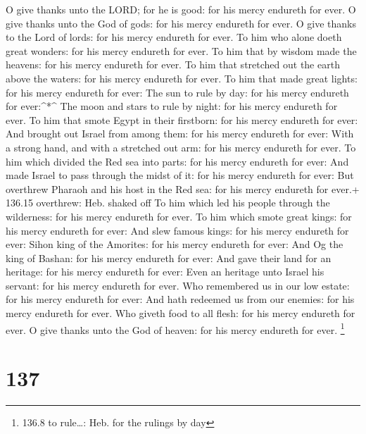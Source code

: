  O give thanks unto the LORD; for he is good: for his mercy
endureth for ever.  O give thanks unto the God of gods: for
his mercy endureth for ever.  O give thanks to the Lord of
lords: for his mercy endureth for ever.  To him who alone
doeth great wonders: for his mercy endureth for ever.  To
him that by wisdom made the heavens: for his mercy endureth for ever.
 To him that stretched out the earth above the waters: for
his mercy endureth for ever.  To him that made great lights:
for his mercy endureth for ever:  The sun to rule by day:
for his mercy endureth for ever:\^{}*\^{}  The moon and
stars to rule by night: for his mercy endureth for ever. 
To him that smote Egypt in their firstborn: for his mercy endureth for
ever:  And brought out Israel from among them: for his
mercy endureth for ever:  With a strong hand, and with a
stretched out arm: for his mercy endureth for ever.  To him
which divided the Red sea into parts: for his mercy endureth for ever:
 And made Israel to pass through the midst of it: for his
mercy endureth for ever:  But overthrew Pharaoh and his
host in the Red sea: for his mercy endureth for ever.+ 136.15 overthrew:
Heb. shaked off  To him which led his people through the
wilderness: for his mercy endureth for ever.  To him which
smote great kings: for his mercy endureth for ever:  And
slew famous kings: for his mercy endureth for ever:  Sihon
king of the Amorites: for his mercy endureth for ever:  And
Og the king of Bashan: for his mercy endureth for ever: 
And gave their land for an heritage: for his mercy endureth for ever:
 Even an heritage unto Israel his servant: for his mercy
endureth for ever.  Who remembered us in our low estate:
for his mercy endureth for ever:  And hath redeemed us from
our enemies: for his mercy endureth for ever.  Who giveth
food to all flesh: for his mercy endureth for ever.  O give
thanks unto the God of heaven: for his mercy endureth for ever.
\footnote{136.8 to rule\ldots: Heb. for the rulings by day}

\hypertarget{section-137}{%
\section{137}\label{section-137}}

